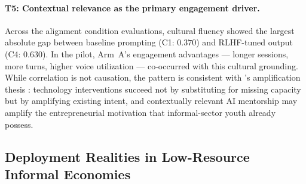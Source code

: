 \paragraph{T5: Contextual relevance as the primary engagement driver.}
Across the alignment condition evaluations, cultural fluency showed the largest absolute gap between baseline prompting (C1: $0.370$) and RLHF-tuned output (C4: $0.630$). In the pilot, Arm~A's engagement advantages --- longer sessions, more turns, higher voice utilization --- co-occurred with this cultural grounding. While correlation is not causation, the pattern is consistent with \citeauthor{toyama2015geek}'s amplification thesis \citep{toyama2015geek}: technology interventions succeed not by substituting for missing capacity but by amplifying existing intent, and contextually relevant AI mentorship may amplify the entrepreneurial motivation that informal-sector youth already possess.

\subsection{Deployment Realities in Low-Resource Informal Economies}
\label{subsec:discussion-deployment}

